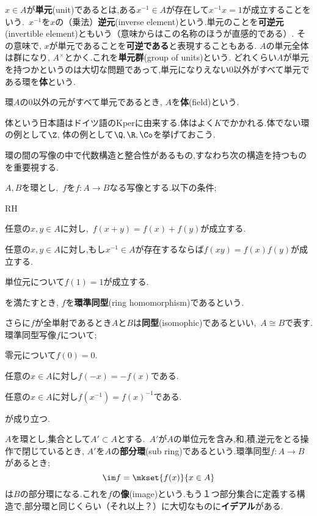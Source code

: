 $x\in A$が\textbf{単元}(unit)であるとは,ある$x^{-1}\in A$が存在して$x^{-1}x=1$が成立することをいう.~$x^{-1}$を$x$の（乗法）\textbf{逆元}(inverse element)という.単元のことを\textbf{可逆元}(invertible element)ともいう（意味からはこの名称のほうが直感的である）. その意味で, $x$が単元であることを\textbf{可逆である}と表現することもある. $A$の単元全体は群になり, $A^\times$とかく.これを\textbf{単元群}(group of units)という. どれくらい$A$が単元を持つかというのは大切な問題であって,単元になりえない$0$以外がすべて単元である環を\textbf{体}という.

\begin{defi}[体]
	環$A$の0以外の元がすべて単元であるとき, $A$を\textbf{体}(field)という.
\end{defi}

体という日本語はドイツ語のKperに由来する.体はよく$K$でかかれる.体でない環の例として$\Z$, 体の例として$\Q,\R,\Co$を挙げておこう.

環の間の写像の中で代数構造と整合性があるもの,すなわち次の構造を持つものを重要視する.

\begin{defi}[環準同型]
	$A,B$を環とし,~$f$を$f:A\to B$なる写像とする.以下の条件;
	\begin{defiterm}{RH}
		\item 任意の$x,y\in A$に対し,~$f(x+y)=f(x)+f(y)$が成立する.
		\item 任意の$x,y\in A$に対し,もし$x^{-1}\in A$が存在するならば$f(xy)=f(x)f(y)$が成立する.
		\item 単位元について$f(1)=1$が成立する.
	\end{defiterm}
	
	を満たすとき, $f$を\textbf{環準同型}(ring homomorphism)であるという.
\end{defi}

さらに$f$が全単射であるとき$A$と$B$は\textbf{同型}(isomophic)であるといい,~$A\cong B$で表す. 環準同型写像$f$について;

\begin{sakura}
	\item 零元について$f(0)=0$.
	\item 任意の$x\in A$に対し$f(-x)=-f(x)$である.
	\item 任意の$x\in A$に対し$f(x^{-1})=f(x)^{-1}$である.
\end{sakura}
が成り立つ.

$A$を環とし,集合として$A'\subset A$とする.~$A'$が$A$の単位元を含み,和,積,逆元をとる操作で閉じているとき, $A'$を$A$の\textbf{部分環}(sub ring)であるという.環準同型$f:A\to B$があるとき;
\[\im f=\mkset{f(x)}{x\in A}\]
は$B$の部分環になる.これを$f$の\textbf{像}(image)という.もう１つ部分集合に定義する構造で,部分環と同じくらい（それ以上？）に大切なものに\textbf{イデアル}がある.

